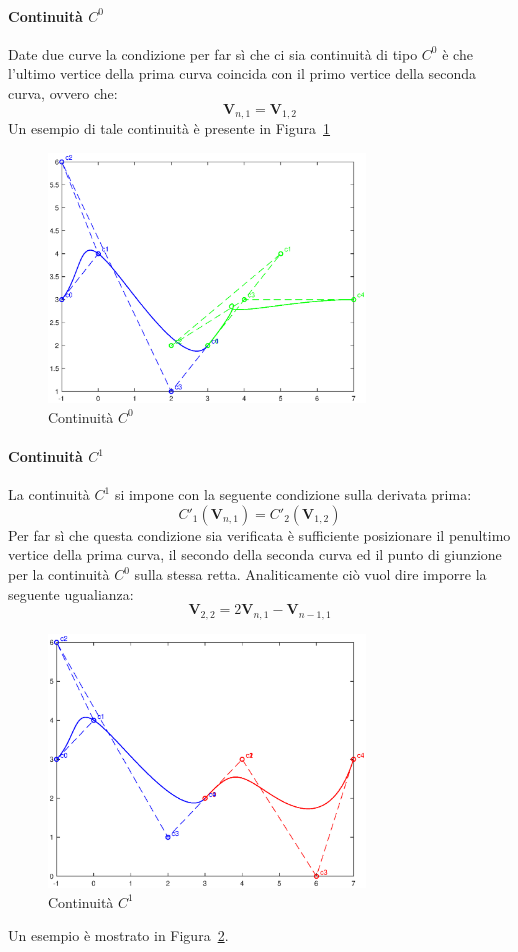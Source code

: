 \documentclass[a4paper, 12pt]{article}
\begin{document}
\paragraph{Continuità $C^0$}
Date due curve la condizione per far sì che ci sia continuità di tipo $C^0$ è che 
l'ultimo vertice della prima curva coincida con il primo vertice della seconda curva, ovvero che:
$$\mathbf{V}_{n,1} = \mathbf{V}_{1, 2}$$
Un esempio di tale continuità è presente in Figura~\ref{fig:continuityc0}
\begin{figure}[]
  \centering
  \includegraphics[width=0.75\textwidth]{figure/continuity_c0.eps}
  \caption{Continuità $C^0$}
  \label{fig:continuityc0}
\end{figure} 

\paragraph{Continuità $C^1$}
La continuità $C^1$ si impone con la seguente condizione sulla derivata prima:
$$C'_1(\mathbf{V}_{n, 1}) = C'_2(\mathbf{V}_{1, 2})$$
Per far sì che questa condizione sia verificata è sufficiente posizionare il 
penultimo vertice della prima curva, il secondo della seconda curva ed il punto di giunzione per la continuità $C^0$ sulla stessa retta.
Analiticamente ciò vuol dire imporre la seguente ugualianza:
$$\mathbf{V}_{2,2} = 2\mathbf{V}_{n, 1} - \mathbf{V}_{n-1, 1}$$
\begin{figure}[]
  \centering
  \includegraphics[width=0.75\textwidth]{figure/continuity_c1.eps}
  \caption{Continuità $C^1$}
  \label{fig:continuityc1}
\end{figure} 
Un esempio è mostrato in Figura~\ref{fig:continuityc1}.
\end{document}
